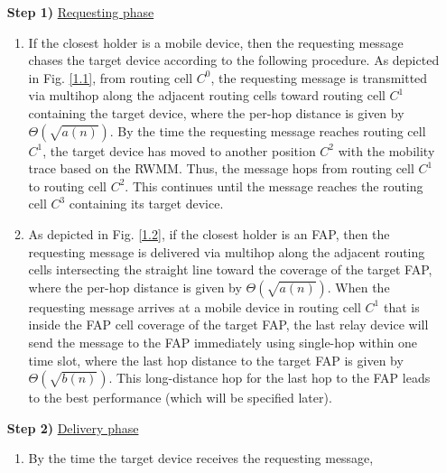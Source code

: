 \documentclass[10pt,journal,compsoc,onecolumn]{IEEEtran}
\begin{document}
\begin{enumerate}[leftmargin=0.325cm, labelsep=0.325cm, align=left, itemsep=-0.1cm, font=\normalfont, label=(\roman*)]
\item[\textbf{Step 1)}] \underline{Requesting phase}
\begin{enumerate}
\item If the closest holder is a mobile device, then the requesting
message chases the target device according to the following
procedure. As depicted in Fig. \ref{1.1}, from routing cell
$C^{0}$, the requesting message is transmitted via multihop along
the adjacent routing cells toward routing cell $C^{1}$ containing
the target device, where the per-hop distance is given by
$\Theta\left(\sqrt{a(n)}\right)$. By the time the requesting
message reaches routing cell $C^{1}$, the target device has moved to
another position $C^{2}$ with the mobility trace based on the
RWMM. Thus, the message hops from routing cell $C^{1}$ to routing
cell $C^{2}$. This continues until the message reaches the routing
cell  $C^{3}$ containing its target device. \vspace{0.15cm} \item As
depicted in Fig. \ref{1.2}, if the closest holder is an FAP, then
the requesting message is delivered via multihop along the
adjacent routing cells intersecting the straight line toward the
coverage of the target FAP, where the per-hop distance is given by
$\Theta\left(\sqrt{a(n)}\right)$. When the requesting message
arrives at a mobile device in routing cell $C^{1}$ that is inside the FAP
cell coverage of the target FAP, the last relay device will send the
message to the FAP immediately using single-hop within one time
slot, where the last hop distance to the target FAP is given by
$\Theta\left(\sqrt{b(n)}\right)$. This long-distance hop for the
last hop to the FAP leads to the best performance (which will be
specified later).%
\end{enumerate}
\item[\textbf{Step 2)}] \underline{Delivery phase}
\begin{enumerate}
\item By the time the target device receives the requesting message,

\end{enumerate}
\end{enumerate}
\end{document}
